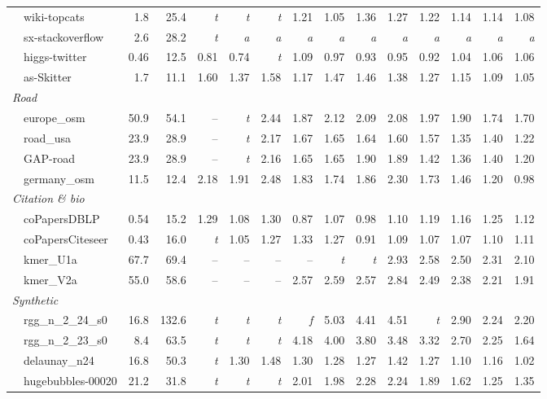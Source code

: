 \begin{table}[t]
\begin{tabular}{lrrrrrrrrrrrrr}
~~wiki-topcats & 1.8 & 25.4 & \emph{t} & \emph{t} & \emph{t} & 1.21 & 1.05 & 1.36 & 1.27 & 1.22 & 1.14 & 1.14 & 1.08 \\
~~sx-stackoverflow & 2.6 & 28.2 & \emph{t} & \emph{a} & \emph{a} & \emph{a} & \emph{a} & \emph{a} & \emph{a} & \emph{a} & \emph{a} & \emph{a} & \emph{a} \\
~~higgs-twitter & 0.46 & 12.5 & 0.81 & 0.74 & \emph{t} & 1.09 & 0.97 & 0.93 & 0.95 & 0.92 & 1.04 & 1.06 & 1.06 \\
~~as-Skitter & 1.7 & 11.1 & 1.60 & 1.37 & 1.58 & 1.17 & 1.47 & 1.46 & 1.38 & 1.27 & 1.15 & 1.09 & 1.05 \\
\multicolumn{14}{l}{\emph{Road}} \\
~~europe\_osm & 50.9 & 54.1 & -- & \emph{t} & 2.44 & 1.87 & 2.12 & 2.09 & 2.08 & 1.97 & 1.90 & 1.74 & 1.70 \\
~~road\_usa & 23.9 & 28.9 & -- & \emph{t} & 2.17 & 1.67 & 1.65 & 1.64 & 1.60 & 1.57 & 1.35 & 1.40 & 1.22 \\
~~GAP-road & 23.9 & 28.9 & -- & \emph{t} & 2.16 & 1.65 & 1.65 & 1.90 & 1.89 & 1.42 & 1.36 & 1.40 & 1.20 \\
~~germany\_osm & 11.5 & 12.4 & 2.18 & 1.91 & 2.48 & 1.83 & 1.74 & 1.86 & 2.30 & 1.73 & 1.46 & 1.20 & 0.98 \\
\multicolumn{14}{l}{\emph{Citation \& bio}} \\
~~coPapersDBLP & 0.54 & 15.2 & 1.29 & 1.08 & 1.30 & 0.87 & 1.07 & 0.98 & 1.10 & 1.19 & 1.16 & 1.25 & 1.12 \\
~~coPapersCiteseer & 0.43 & 16.0 & \emph{t} & 1.05 & 1.27 & 1.33 & 1.27 & 0.91 & 1.09 & 1.07 & 1.07 & 1.10 & 1.11 \\
~~kmer\_U1a & 67.7 & 69.4 & -- & -- & -- & -- & \emph{t} & \emph{t} & 2.93 & 2.58 & 2.50 & 2.31 & 2.10 \\
~~kmer\_V2a & 55.0 & 58.6 & -- & -- & -- & 2.57 & 2.59 & 2.57 & 2.84 & 2.49 & 2.38 & 2.21 & 1.91 \\
\multicolumn{14}{l}{\emph{Synthetic}} \\
~~rgg\_n\_2\_24\_s0 & 16.8 & 132.6 & \emph{t} & \emph{t} & \emph{t} & \emph{f} & 5.03 & 4.41 & 4.51 & \emph{t} & 2.90 & 2.24 & 2.20 \\
~~rgg\_n\_2\_23\_s0 & 8.4 & 63.5 & \emph{t} & \emph{t} & \emph{t} & 4.18 & 4.00 & 3.80 & 3.48 & 3.32 & 2.70 & 2.25 & 1.64 \\
~~delaunay\_n24 & 16.8 & 50.3 & \emph{t} & 1.30 & 1.48 & 1.30 & 1.28 & 1.27 & 1.42 & 1.27 & 1.10 & 1.16 & 1.02 \\
~~hugebubbles-00020 & 21.2 & 31.8 & \emph{t} & \emph{t} & \emph{t} & 2.01 & 1.98 & 2.28 & 2.24 & 1.89 & 1.62 & 1.25 & 1.35 \\

\end{tabular}
\end{table}
